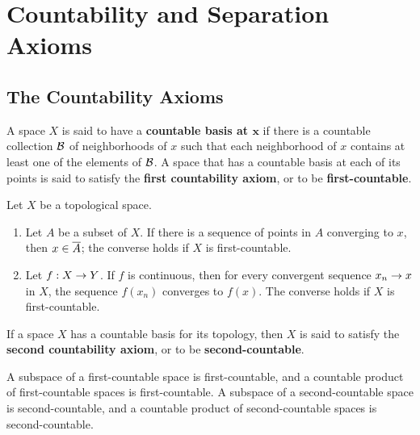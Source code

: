 \newpage
\setcounter{section}{3}
\section{Countability and Separation Axioms}

\subsection{The Countability Axioms}\nl
\setcounter{section}{30}
\setcounter{thm}{0}

\vs

\dfn A space $X$ is said to have a \textbf{countable basis at $\boldsymbol{x}$} if there is a countable collection $\mathcal{B}$ of neighborhoods of $x$ such that each neighborhood of $x$ contains at least one of the elements of $\mathcal{B}$. A space that has a countable basis at each of its points is said to satisfy the \textbf{first countability axiom}, or to be \textbf{first-countable}.

\vs

\begin{thm}
Let $X$ be a topological space.
\begin{enumerate}
    \item Let $A$ be a subset of $X$. If there is a sequence of points in $A$ converging to $x$, then $x\in \overline A$; the converse holds if $X$ is first-countable.
    \item Let $f:X\rightarrow Y$. If $f$ is continuous, then for every convergent sequence $x_n\rightarrow x$ in $X$, the sequence $f(x_n)$ converges to $f(x)$. The converse holds if $X$ is first-countable.
\end{enumerate}
\end{thm}

\vs

\dfn If a space $X$ has a countable basis for its topology, then $X$ is said to satisfy the \textbf{second countability axiom}, or to be \textbf{second-countable}.

\vs

\begin{thm}
A subspace of a first-countable space is first-countable, and a countable product of first-countable spaces is first-countable. A subspace of a second-countable space is second-countable, and a countable product of second-countable spaces is second-countable.
\end{thm}

